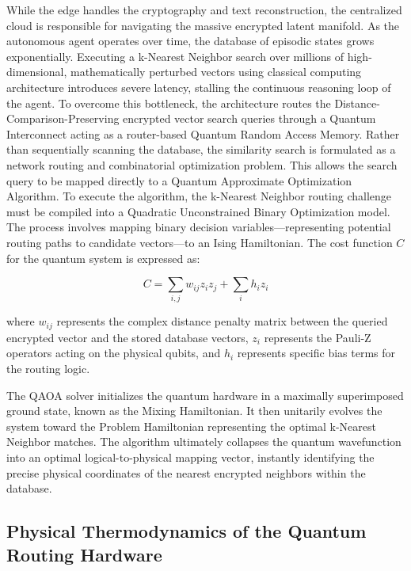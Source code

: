 \documentclass[12pt]{article}
\begin{document}
While the edge handles the cryptography and text reconstruction, the centralized cloud is responsible for navigating the massive encrypted latent manifold. As the autonomous agent operates over time, the database of episodic states grows exponentially. Executing a k-Nearest Neighbor search over millions of high-dimensional, mathematically perturbed vectors using classical computing architecture introduces severe latency, stalling the continuous reasoning loop of the agent. To overcome this bottleneck, the architecture routes the Distance-Comparison-Preserving encrypted vector search queries through a Quantum Interconnect acting as a router-based Quantum Random Access Memory. Rather than sequentially scanning the database, the similarity search is formulated as a network routing and combinatorial optimization problem. This allows the search query to be mapped directly to a Quantum Approximate Optimization Algorithm. To execute the algorithm, the k-Nearest Neighbor routing challenge must be compiled into a Quadratic Unconstrained Binary Optimization model. The process involves mapping binary decision variables—representing potential routing paths to candidate vectors—to an Ising Hamiltonian. The cost function $C$ for the quantum system is expressed as:

\begin{equation}
C = \sum_{i,j} w_{ij} z_i z_j + \sum_i h_i z_i
\end{equation}

where $w_{ij}$ represents the complex distance penalty matrix between the queried encrypted vector and the stored database vectors, $z_i$ represents the Pauli-Z operators acting on the physical qubits, and $h_i$ represents specific bias terms for the routing logic.

The QAOA solver initializes the quantum hardware in a maximally superimposed ground state, known as the Mixing Hamiltonian. It then unitarily evolves the system toward the Problem Hamiltonian representing the optimal k-Nearest Neighbor matches. The algorithm ultimately collapses the quantum wavefunction into an optimal logical-to-physical mapping vector, instantly identifying the precise physical coordinates of the nearest encrypted neighbors within the database.

\subsection{Physical Thermodynamics of the Quantum Routing Hardware}
\end{document}
